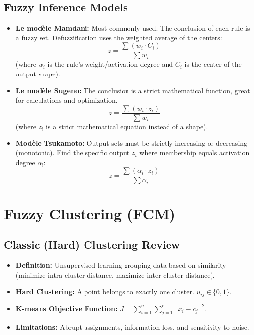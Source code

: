 \documentclass[11pt,a4paper]{article}
\begin{document}
\subsection{Fuzzy Inference Models}
\begin{itemize}
    \item \textbf{Le modèle Mamdani:} Most commonly used. The conclusion of each rule is a fuzzy set. Defuzzification uses the weighted average of the centers:
    \[ z = \frac{\sum (w_i \cdot C_i)}{\sum w_i} \]
    (where $w_i$ is the rule's weight/activation degree and $C_i$ is the center of the output shape).
    
    \item \textbf{Le modèle Sugeno:} The conclusion is a strict mathematical function, great for calculations and optimization.
    \[ z = \frac{\sum (w_i \cdot z_i)}{\sum w_i} \]
    (where $z_i$ is a strict mathematical equation instead of a shape).
    
    \item \textbf{Modèle Tsukamoto:} Output sets must be strictly increasing or decreasing (monotonic). Find the specific output $z_i$ where membership equals activation degree $\alpha_i$:
    \[ z = \frac{\sum (\alpha_i \cdot z_i)}{\sum \alpha_i} \]
\end{itemize}

\newpage
\section{Fuzzy Clustering (FCM)}

\subsection{Classic (Hard) Clustering Review}
\begin{itemize}
    \item \textbf{Definition:} Unsupervised learning grouping data based on similarity (minimize intra-cluster distance, maximize inter-cluster distance).
    \item \textbf{Hard Clustering:} A point belongs to exactly one cluster. $u_{ij} \in \{0, 1\}$.
    \item \textbf{K-means Objective Function:} $J = \sum_{i=1}^n \sum_{j=1}^c ||x_i - c_j||^2$.
    \item \textbf{Limitations:} Abrupt assignments, information loss, and sensitivity to noise.
\end{itemize}
\end{document}
